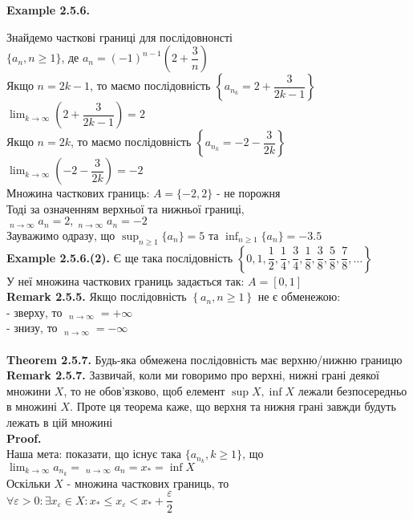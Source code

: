 \documentclass[a4paper, 14pt]{extarticle}
\DeclareMathOperator*\uplim{\overline{lim}}
\DeclareMathOperator*\downlim{\underline{lim}}
\def\huge{\displaystyle}
\def\bigline{\vspace{5mm}\\}
\def\ex#1{\textbf{Example {#1}}}
\def\rm#1{\textbf{Remark {#1}}}
\def\proof{\textbf{Proof.}\\}
\def\bigline{\vspace{5mm}\\}
\def\sequence#1{$\displaystyle \left\{ {#1}, n\geq1 \right\}$}
\begin{document}
	\hypertarget{ex2.6.6.}{\textbf{Example 2.5.6.}} Знайдемо часткові границі для послідовнонсті\\ $\{a_n, n \geq 1\}$, де $a_n = (-1)^{n-1} \left(2 + \dfrac{3}{n} \right)$\\
	Якщо $n = 2k-1$, то маємо послідовність $\left\{a_{n_k} = 2 + \dfrac{3}{2k-1} \right\}$\\
	$\huge\lim_{k \to \infty} \left( 2 + \dfrac{3}{2k-1} \right) = 2$\\
	Якщо $n = 2k$, то маємо послідовність $\left\{a_{n_k} = -2 - \dfrac{3}{2k}\right\}$\\
	$\huge\lim_{k \to \infty} \left(-2 - \dfrac{3}{2k} \right) = -2$\\
	Множина часткових границь: $A = \{-2, 2\}$ - не порожня\\
	Тоді за означенням верхньої та нижньої границі, \\ $\huge \uplim_{n \to \infty} a_n = 2, \huge \downlim_{n \to \infty} a_n = -2$\\
	Зауважимо одразу, що $\huge \sup_{n \geq 1} \{a_n\} = 5$ та $\huge \inf_{n \geq 1} \{a_n\} = -3.5$
	\bigline
	\ex{2.5.6.(2).} Є ще така послідовність $\left\{ 0, 1, \dfrac{1}{2}, \dfrac{1}{4}, \dfrac{3}{4}, \dfrac{1}{8}, \dfrac{3}{8}, \dfrac{5}{8}, \dfrac{7}{8}, \dots \right\}$\\
	У неї множина часткових границь задається так: $A = [0,1]$
	\bigline
	\textbf{Remark 2.5.5.} Якщо послідовність \sequence{a_n} не є обменежою:\\
	- зверху, то $\displaystyle \uplim_{n \to \infty} = +\infty$\\
	- знизу, то $\displaystyle \downlim_{n \to \infty} = -\infty$\\
	\bigline
	\textbf{Theorem 2.5.7.} Будь-яка обмежена послідовність має верхню/нижню границю\\
	\rm{2.5.7.} Зазвичай, коли ми говоримо про верхні, нижні грані деякої множини $X$, то не обов'язково, щоб елемент $\sup X, \inf X$ лежали безпосередньо в множині $X$. Проте ця теорема каже, що верхня та нижня грані завжди будуть лежать в цій множині\\
	\proof
	Наша мета: показати, що існує така $\{a_{n_k}, k \geq 1\}$, що \\ $\huge \lim_{k \to \infty} a_{n_k} = \downlim_{n \to \infty} a_n = x_* = \inf X$\\
	Оскільки $X$ - множина часткових границь, то\\
	$\forall \varepsilon > 0: \exists x_{\varepsilon} \in X: x_* \leq x_{\varepsilon} < x_* + \dfrac{\varepsilon}{2}$\\
\end{document}
